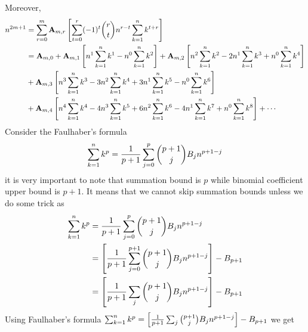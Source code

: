 Moreover,
\begin{equation}
    \begin{split}
        n^{2m+1}
        &= \sum_{r=0}^{m} {\mathbf{A}} \sb{m,r} \left[ \sum_{t=0}^{r} (-1)^t \binom{r}{t} n^{r-t} \sum_{k=1}^{n} k^{t+r} \right] \\
        &= {\mathbf{A}} \sb{m,0}
        + {\mathbf{A}} \sb{m,1} \left[ n^{1} \sum_{k=1}^{n} k^{1} - n^{0} \sum_{k=1}^{n} k^{2} \right]
        + {\mathbf{A}} \sb{m,2} \left[ n^{2} \sum_{k=1}^{n} k^{2} - 2 n^{1} \sum_{k=1}^{n} k^{3} + n^{0} \sum_{k=1}^{n} k^{4}\right] \\
        &+ {\mathbf{A}} \sb{m,3} \left[ n^{3} \sum_{k=1}^{n} k^{3} - 3 n^{2} \sum_{k=1}^{n} k^{4} + 3 n^{1} \sum_{k=1}^{n} k^{5} - n^{0} \sum_{k=1}^{n} k^{6} \right] \\
        &+ {\mathbf{A}} \sb{m,4} \left[ n^{4} \sum_{k=1}^{n} k^{4} - 4 n^{3} \sum_{k=1}^{n} k^{5} + 6 n^{2} \sum_{k=1}^{n} k^{6} - 4 n^{1} \sum_{k=1}^{n} k^{7} + n^{0} \sum_{k=1}^{n} k^{8} \right] + \cdots \\
    \end{split}\label{eq:equation14}
\end{equation}
Consider the Faulhaber's formula
\begin{equation}
    \sum_{k=1}^{n} k^{p} = \frac{1}{p+1}\sum_{j=0}^{p} \binom{p+1}{j} {B}\sb{j} n^{p+1-j}\label{eq:equation3}
\end{equation}
it is very important to note that summation bound is $p$ while binomial coefficient upper bound is $p+1$.
It means that we cannot skip summation bounds unless we do some trick as
\begin{equation}
    \begin{split}
        \sum_{k=1}^{n} k^{p} &= \frac{1}{p+1}\sum_{j=0}^{p} \binom{p+1}{j} {B}\sb{j} n^{p+1-j} \\
        &= \left[ \frac{1}{p+1}\sum_{j=0}^{p+1} \binom{p+1}{j} {B}\sb{j} n^{p+1-j} \right] - {B}\sb{p+1} \\
        &= \left[ \frac{1}{p+1}\sum_{j} \binom{p+1}{j} {B}\sb{j} n^{p+1-j} \right] - {B}\sb{p+1} \\
    \end{split}\label{eq:faulhaber-formula}
\end{equation}
Using Faulhaber's formula
$\sum_{k=1}^{n} k^{p} = \left[ \frac{1}{p+1}\sum_{j} \binom{p+1}{j} {B}\sb{j} n^{p+1-j} \right] - {B}\sb{p+1}$
we get

